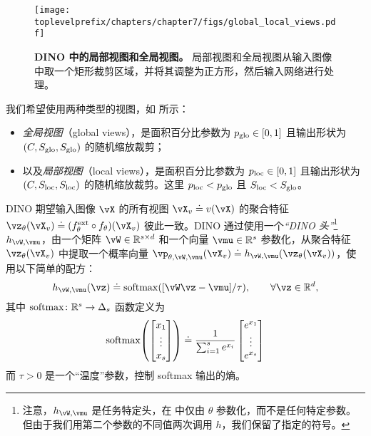 \documentclass[../../book-main.tex]{subfiles}
\begin{document}
\begin{figure}
    \centering 
    \texttt{[image: \\toplevelprefix/chapters/chapter7/figs/global\_local\_views.pdf]}
    \caption{\textbf{DINO 中的局部视图和全局视图。} 局部视图和全局视图从输入图像中取一个矩形裁剪区域，并将其调整为正方形，然后输入网络进行处理。}
    \label{fig:dino_local_global_views}
\end{figure}

我们希望使用两种类型的视图，如  所示：
\begin{itemize}
    \item \textit{全局视图}（global views），是面积百分比参数为 \(p_{\mathrm{glo}} \in [0, 1]\) 且输出形状为 \((C, S_{\mathrm{glo}}, S_{\mathrm{glo}})\) 的随机缩放裁剪；
    \item 以及\textit{局部视图}（local views），是面积百分比参数为 \(p_{\mathrm{loc}} \in [0, 1]\) 且输出形状为 \((C, S_{\mathrm{loc}}, S_{\mathrm{loc}})\) 的随机缩放裁剪。这里 \(p_{\mathrm{loc}} < p_{\mathrm{glo}}\) 且 \(S_{\mathrm{loc}} < S_{\mathrm{glo}}\)。
\end{itemize}

DINO 期望输入图像 \(\vX\) 的所有视图 \(\vX_{v} \doteq v(\vX)\) 的聚合特征 \(\vz_{\theta}(\vX_{v}) \doteq (f_{\theta}^{\ext} \circ f_{\theta})(\vX_{v})\) 彼此一致。DINO 通过使用一个\textit{“DINO 头”}\footnote{注意，\(h_{\vW, \vmu}\) 是任务特定头，在  中仅由 \(\theta\) 参数化，而不是任何特定参数。但由于我们用第二个参数的不同值两次调用 \(h\)，我们保留了指定的符号。} \(h_{\vW, \vmu}\)，由一个矩阵 \(\vW \in \R^{s \times d}\) 和一个向量 \(\vmu \in \R^{s}\) 参数化，从聚合特征 \(\vz_{\theta}(\vX_{v})\) 中提取一个概率向量 \(\vp_{\theta, \vW, \vmu}(\vX_{v}) \doteq h_{\vW, \vmu}(\vz_{\theta}(\vX_{v}))\)，使用以下简单的配方：
\begin{equation}
    h_{\vW, \vmu}(\vz) \doteq \softmax([\vW\vz - \vmu]/\tau), \qquad \forall \vz \in \R^{d},
\end{equation}
其中 \(\operatorname{\mathrm{softmax}} \colon \mathbb{R}^{s} \to \Delta_{s}\) 函数定义为
\begin{equation}
    \softmax\rp{\mat{x_{1} \\ \vdots \\ x_{s}}} \doteq \frac{1}{\sum_{i = 1}^{s}e^{x_{i}}}\mat{e^{x_{1}} \\ \vdots \\ e^{x_{s}}}
\end{equation}
而 \(\tau > 0\) 是一个“温度”参数，控制 softmax 输出的熵。
\end{document}
